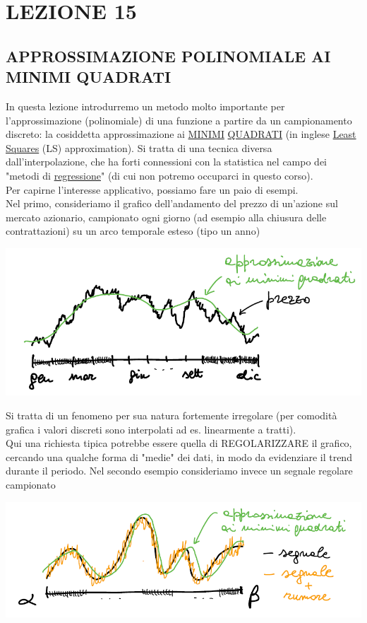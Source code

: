 \documentclass[12pt,a4paper]{article}
\begin{document}
\section*{LEZIONE 15}
\subsection*{APPROSSIMAZIONE POLINOMIALE AI MINIMI QUADRATI}
In questa lezione introdurremo un metodo molto importante per l'approssimazione (polinomiale) di una funzione a partire da un campionamento discreto: la cosiddetta approssimazione ai \underline{MINIMI} \underline{QUADRATI} (in inglese \underline{Least Squares} (LS) approximation). Si tratta di una tecnica diversa\\ dall'interpolazione, che ha forti connessioni con la statistica nel
campo dei "metodi di \underline{regressione}" (di cui non potremo occuparci in questo corso).\\
Per capirne l'interesse applicativo, possiamo fare un paio di esempi.\\
Nel primo, consideriamo il grafico dell'andamento del prezzo di un'azione sul mercato azionario, campionato ogni giorno (ad esempio alla chiusura delle contrattazioni) su un arco temporale esteso (tipo un anno)
\begin{center}
    \includegraphics[scale=0.7]{pag2.png}
\end{center}
Si tratta di un fenomeno per sua natura fortemente irregolare (per comodità grafica i valori discreti sono interpolati ad es. linearmente a tratti).\\
Qui una richiesta tipica potrebbe essere quella di REGOLARIZZARE il grafico, cercando una qualche forma di "medie" dei dati, in modo da evidenziare il trend durante il periodo.
\newline\newline
Nel secondo esempio consideriamo invece un segnale regolare campionato
\begin{center}
    \includegraphics[scale=0.7]{pag3.png}
\end{center}
\end{document}
